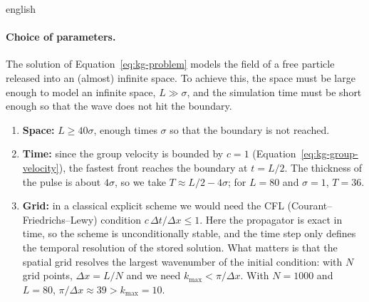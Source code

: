 \documentclass[../0000.tex]{subfiles}
\begin{document}
\begin{hyphenrules}{english}
\paragraph{Choice of parameters.}
The solution of Equation~\eqref{eq:kg-problem} models the field of a free particle released into an (almost)
infinite space. To achieve this, the space must be large enough to model an infinite space, $L\gg\sigma$,
and the simulation time must be short enough so that the wave does not hit the boundary.
\begin{enumerate}
  \item \textbf{Space:} $L\ge40\sigma$, enough times $\sigma$ so that the boundary is not reached.
  \item \textbf{Time:} since the group velocity is bounded by $c=1$ (Equation~\eqref{eq:kg-group-velocity}), the
    fastest front reaches the boundary at $t=L/2$. The thickness of the pulse is about $4\sigma$, so we
    take $T\approx L/2-4\sigma$; for $L=80$ and $\sigma=1$, $T=36$.
  \item \textbf{Grid:} in a classical explicit scheme we would need the CFL (Courant--Friedrichs--Lewy)
    condition $c\,\Delta t/\Delta x\le1$. Here the propagator is exact in time, so the scheme is
    unconditionally stable, and the time step only defines the temporal resolution of the stored
    solution. What matters is that the spatial grid resolves the largest wavenumber of the initial
    condition: with $N$ grid points, $\Delta x=L/N$ and we need $k_{\max}<\pi/\Delta x$. With $N=1000$ and
    $L=80$, $\pi/\Delta x\approx39>k_{\max}=10$.
\end{enumerate}


\end{hyphenrules}
\end{document}
